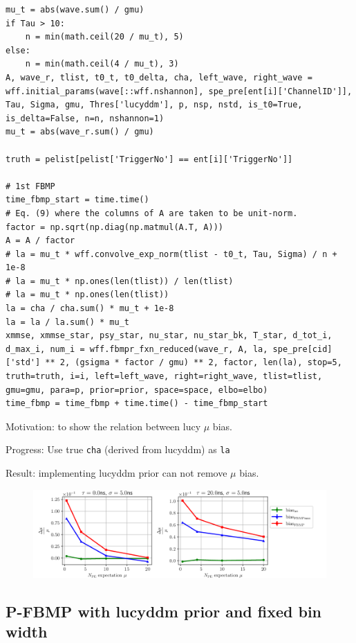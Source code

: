 \documentclass[notitlepage]{article}
\begin{document}
\begin{lstlisting}
mu_t = abs(wave.sum() / gmu)
if Tau > 10:
    n = min(math.ceil(20 / mu_t), 5)
else:
    n = min(math.ceil(4 / mu_t), 3)
A, wave_r, tlist, t0_t, t0_delta, cha, left_wave, right_wave = wff.initial_params(wave[::wff.nshannon], spe_pre[ent[i]['ChannelID']], Tau, Sigma, gmu, Thres['lucyddm'], p, nsp, nstd, is_t0=True, is_delta=False, n=n, nshannon=1)
mu_t = abs(wave_r.sum() / gmu)

truth = pelist[pelist['TriggerNo'] == ent[i]['TriggerNo']]

# 1st FBMP
time_fbmp_start = time.time()
# Eq. (9) where the columns of A are taken to be unit-norm.
factor = np.sqrt(np.diag(np.matmul(A.T, A)))
A = A / factor
# la = mu_t * wff.convolve_exp_norm(tlist - t0_t, Tau, Sigma) / n + 1e-8
# la = mu_t * np.ones(len(tlist)) / len(tlist)
# la = mu_t * np.ones(len(tlist))
la = cha / cha.sum() * mu_t + 1e-8
la = la / la.sum() * mu_t
xmmse, xmmse_star, psy_star, nu_star, nu_star_bk, T_star, d_tot_i, d_max_i, num_i = wff.fbmpr_fxn_reduced(wave_r, A, la, spe_pre[cid]['std'] ** 2, (gsigma * factor / gmu) ** 2, factor, len(la), stop=5, truth=truth, i=i, left=left_wave, right=right_wave, tlist=tlist, gmu=gmu, para=p, prior=prior, space=space, elbo=elbo)
time_fbmp = time_fbmp + time.time() - time_fbmp_start
\end{lstlisting}

Motivation: to show the relation between lucy $\mu$ bias. 

Progress: Use true \texttt{cha} (derived from lucyddm) as \texttt{la}

Result: implementing lucyddm prior can not remove $\mu$ bias. 

\begin{figure}[H]
    \includegraphics[width=\textwidth]{vs-biasmu-lucyprior.png}
\end{figure}

\subsection{P-FBMP with lucyddm prior and fixed bin width}
\end{document}

